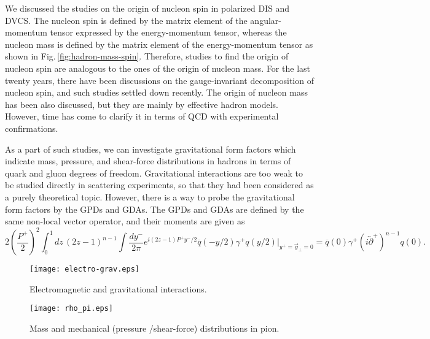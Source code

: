 \documentclass{PoS}
\begin{document}
We discussed the studies on the origin of nucleon spin 
in polarized DIS and DVCS. The nucleon spin is defined by
the matrix element of the angular-momentum tensor expressed by
the energy-momentum tensor, whereas the nucleon mass
is defined by the matrix element of the energy-momentum tensor
as shown in Fig.\,\ref{fig:hadron-mass-spin}.
Therefore, studies to find the origin of nucleon spin 
are analogous to the ones of the origin of nucleon mass.
For the last twenty years, there have been discussions
on the gauge-invariant decomposition of nucleon spin,
and such studies settled down recently. The origin of nucleon
mass has been also discussed, but they are mainly by 
effective hadron models. However, time has come to
clarify it in terms of QCD with experimental confirmations.

As a part of such studies, we can investigate gravitational
form factors which indicate mass, pressure, and shear-force
distributions in hadrons in terms of quark and gluon degrees of freedom. 
Gravitational interactions are too weak to be studied directly 
in scattering experiments, so that they had been considered as
a purely theoretical topic. However, there is a way to probe
the gravitational form factors by the GPDs and GDAs.
The GPDs and GDAs are defined by the same non-local vector operator,
and their moments are given as
\begin{equation}
2 \left ( \frac{P^+}{2}  \right ) ^2
 \! \! \! \int_0^1 \! \! dz \, (2z-1)^{n-1} 
  \! \!  \int\frac{d y^-}{2\pi}e^{i (2z-1) P^+ y^- /2}
  \overline{q}(-y/2) \gamma^+ q(y/2) \Big |_{y^+ = \vec y_\perp =0}
\! \! \!
 = \overline q (0) \gamma^+ \!
 \left ( i \overleftrightarrow \partial^+  \right )^{n-1} 
\! \! \! \!
 q(0) .
\nonumber
\label{eqn:tensor-int}
\end{equation}

\begin{wrapfigure}[18]{r}{0.40\textwidth}
   \vspace{-0.7cm} 
   \begin{center}
     \texttt{[image: electro-grav.eps]}
   \end{center}
\vspace{-0.60cm}
\caption{Electromagnetic and gravitational interactions.}
\label{fig:elemag-grav}
   \vspace{+0.1cm}
   \begin{center}
     \texttt{[image: rho\_pi.eps]}
   \end{center}
\vspace{-0.70cm}
\caption{Mass and mechanical (pressure /shear-force) distributions in pion.}
\label{fig:rho_pi}
\vspace{-0.60cm}
\end{wrapfigure}
\end{document}
